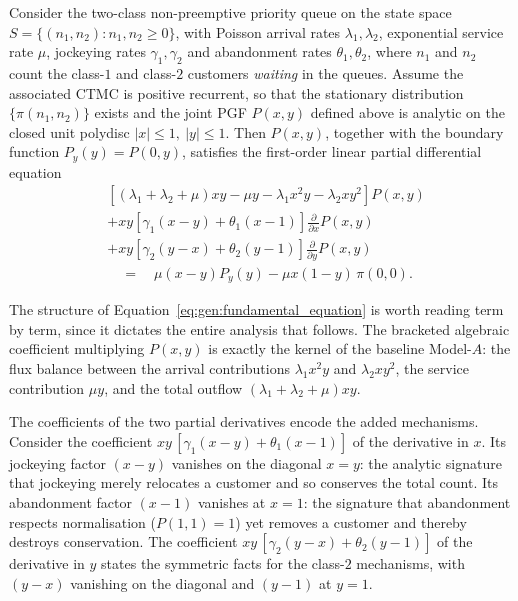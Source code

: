 \begin{lemma}\label{lem:gen:fundamental_equation}
Consider the two-class non-preemptive priority queue on the state space
$S=\{(n_1,n_2):n_1,n_2\ge 0\}$, with Poisson arrival rates $\lambda_1,\lambda_2$,
exponential service rate $\mu$, jockeying rates $\gamma_1,\gamma_2$ and abandonment
rates $\theta_1,\theta_2$, where $n_1$ and $n_2$ count the class-$1$ and class-$2$
customers \emph{waiting} in the queues. Assume the associated CTMC is positive
recurrent, so that the stationary distribution $\{\pi(n_1,n_2)\}$ exists and the
joint PGF $P(x,y)$ defined above is analytic on the closed unit polydisc
$|x|\le 1,\ |y|\le 1$. Then $P(x,y)$, together with the boundary function
$P_y(y)=P(0,y)$, satisfies the first-order linear partial differential equation
\begin{equation}
\begin{split}
    & \left[ (\lambda_1+\lambda_2+\mu)xy - \mu y - \lambda_1 x^2 y - \lambda_2 x y^2 \right] P(x,y) \\
    & + xy \left[ \gamma_1(x-y) + \theta_1(x-1) \right] \frac{\partial}{\partial x} P(x,y) \\
    & + xy \left[ \gamma_2(y-x) + \theta_2(y-1) \right] \frac{\partial}{\partial y} P(x,y) \\
    & \quad = \quad \mu(x-y) P_y(y) - \mu x(1-y)\,\pi(0,0).
\end{split}
\label{eq:gen:fundamental_equation}
\end{equation}
\end{lemma}

The structure of Equation~\eqref{eq:gen:fundamental_equation} is worth reading term by term, since it dictates the entire analysis that follows. The bracketed algebraic coefficient multiplying $P(x,y)$ is exactly the kernel of the baseline Model-$A$: the flux balance between the arrival contributions $\lambda_1 x^2 y$ and $\lambda_2 x y^2$, the service contribution $\mu y$, and the total outflow $(\lambda_1+\lambda_2+\mu)xy$.

The coefficients of the two partial derivatives encode the added mechanisms. Consider the coefficient $xy\,[\gamma_1(x-y)+\theta_1(x-1)]$ of the derivative in $x$. Its jockeying factor $(x-y)$ vanishes on the diagonal $x=y$: the analytic signature that jockeying merely relocates a customer and so conserves the total count. Its abandonment factor $(x-1)$ vanishes at $x=1$: the signature that abandonment respects normalisation ($P(1,1)=1$) yet removes a customer and thereby destroys conservation. The coefficient $xy\,[\gamma_2(y-x)+\theta_2(y-1)]$ of the derivative in $y$ states the symmetric facts for the class-$2$ mechanisms, with $(y-x)$ vanishing on the diagonal and $(y-1)$ at $y=1$.

